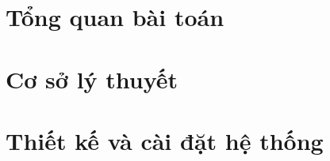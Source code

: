 \documentclass[12pt,a4paper,oneside]{report}
\numberwithin{equation}{chapter}
\numberwithin{figure}{chapter}
\numberwithin{table}{chapter}
\begin{document}





\begingroup
\hypersetup{linkcolor=black}
\setcounter{tocdepth}{1}
\clearpage
{}
{}
\tableofcontents

\clearpage
{}
{}
\listoffigures

\clearpage
{}
{}
\listoftables
\endgroup



\clearpage
{}
\setcounter{page}{1}

\chapter{Tổng quan bài toán}
\label{chap:tong_quan}




\chapter{Cơ sở lý thuyết}
\label{chap:co_so_ly_thuyet}






\chapter{Thiết kế và cài đặt hệ thống}
\label{chap:thiet_ke_cai_dat}





\end{document}
